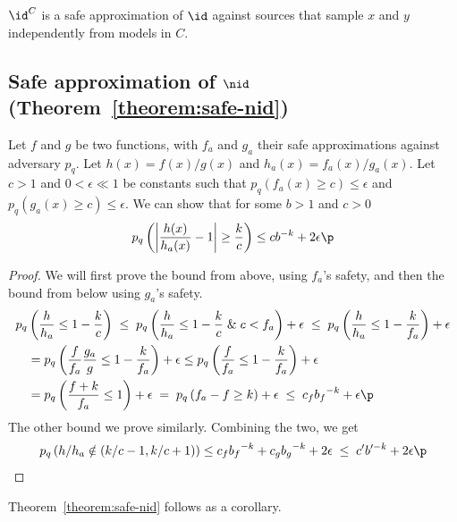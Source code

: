 \begin{corollary}
$\id^C$ is a safe approximation of $\id$ against sources that sample $x$ and $y$ independently from models in $C$.
\end{corollary}

\subsection{Safe approximation of $\nid$ (Theorem~\ref{theorem:safe-nid})}

\begin{lemma}
Let $f$ and $g$ be two functions, with $f_a$ and $g_a$ their safe approximations against adversary $p_q$. Let $h(x) = f(x)/g(x)$ and $h_a(x) = f_a(x)/g_a(x)$. Let $c > 1$ and $0 < \epsilon \ll 1$ be constants such that $p_q(f_a(x) \geq c) \leq \epsilon$ and $p_q(g_a(x) \geq c) \leq \epsilon$. We can show that for some $b > 1$ and $c > 0$
\[
p_q\left(\left|\frac{h(x)}{h_a(x)} - 1\right| \geq \frac{k}{c}\right) \leq cb^{-k} + 2\epsilon \p
\]
\end{lemma}
\begin{proof}
We will first prove the bound from above, using $f_a$'s safety, and then the bound from below using $g_a$'s safety. 
\begin{align*}
p_q&\left(\frac{h}{h_a} \leq 1 - \frac{k}{c}\right) \;\leq\; p_q\left(\frac{h}{h_a} \leq 1 - \frac{k}{c} \;\&\; c < f_a \right) + \epsilon \;\leq\; p_q\left(\frac{h}{h_a} \leq 1 - \frac{k}{f_a} \right) + \epsilon \\
 &= p_q\left(\frac{f}{f_a}\frac{g_a}{g} \leq 1 - \frac{k}{f_a} \right) + \epsilon \leq p_q\left(\frac{f}{f_a} \leq 1 - \frac{k}{f_a} \right) + \epsilon \\
 &= p_q\left(\frac{f + k}{f_a} \leq 1 \right) + \epsilon \;=\;p_q\left(f_a - f \geq k \right) + \epsilon \;\leq\; c_f{b_f}^{-k} + \epsilon\p
\end{align*}
The other bound we prove similarly. Combining the two, we get\belowdisplayskip=-12pt
\begin{align*}
p_q\left(h/h_a \notin \left(k/c - 1, k/c + 1\right)\right) \leq c_f{b_f}^{-k} + c_g{b_g}^{-k} + 2\epsilon \;\leq\; c'b'^{-k} + 2\epsilon \p
\end{align*}
\end{proof} 
Theorem~\ref{theorem:safe-nid} follows as a corollary.
